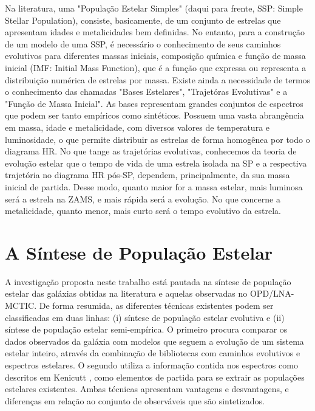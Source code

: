 Na literatura, uma "População Estelar Simples" (daqui para frente, SSP: Simple Stellar Population), consiste, basicamente, de um conjunto de estrelas que apresentam idades e metalicidades bem definidas. No entanto, para a construção de um modelo de uma SSP, é necessário o conhecimento de seus caminhos evolutivos para diferentes massas iniciais, composição química e função de massa inicial (IMF: Initial Mass Function), que é a função que expressa ou representa a distribuição numérica de estrelas por massa. Existe ainda a necessidade de termos o conhecimento das chamadas "Bases Estelares", "Trajetóras Evolutivas" e a "Função de Massa Inicial".  As bases representam grandes conjuntos de espectros que podem ser tanto empíricos como sintéticos. Possuem uma vasta abrangência em massa, idade e metalicidade, com diversos valores de temperatura e luminosidade, o que permite distribuir as estrelas de forma homogênea por todo o diagrama HR. No que tange as trajetórias evolutivas, conhecemos da teoria de evolução estelar que o tempo de vida de uma estrela isolada na SP e a respectiva trajetória no diagrama HR pós-SP, dependem, principalmente, da sua massa inicial de partida. Desse modo, quanto maior for a massa estelar, mais luminosa será a estrela na ZAMS, e mais rápida será a evolução. No que concerne a metalicidade, quanto menor, mais curto será o tempo evolutivo da estrela. 

\section{A Síntese de População Estelar}

A investigação proposta neste trabalho está pautada na síntese de população estelar das galáxias obtidas na literatura e aquelas observadas no OPD/LNA-MCTIC. De forma resumida, as diferentes técnicas existentes podem ser classificadas em duas linhas: (i) síntese de população estelar evolutiva e (ii) síntese de população estelar semi-empírica. O primeiro procura comparar os dados observados da galáxia com modelos que seguem a evolução de um sistema estelar inteiro, através da combinação de bibliotecas com caminhos evolutivos e espectros estelares. O segundo utiliza a informação contida nos espectros como descritos em Kenicutt \cite{kennicutt1998star}, como elementos de partida para se extrair as populações estelares existentes. Ambas técnicas apresentam vantagens e desvantagens, e diferenças em relação ao conjunto de observáveis que são sintetizados.

